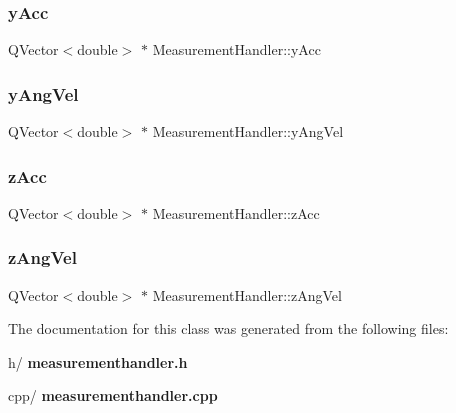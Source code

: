 \subsubsection{y\+Acc}
{\footnotesize\ttfamily Q\+Vector$<$double$>$ $\ast$ Measurement\+Handler\+::y\+Acc\hspace{0.3cm}{\ttfamily [private]}}

\mbox{\label{class_measurement_handler_a070b01770bd61164f1b4672bea4f14dd}} 
\subsubsection{y\+Ang\+Vel}
{\footnotesize\ttfamily Q\+Vector$<$double$>$ $\ast$ Measurement\+Handler\+::y\+Ang\+Vel\hspace{0.3cm}{\ttfamily [private]}}

\mbox{\label{class_measurement_handler_a733eb0086b7fcdb942a770a178fd3862}} 
\subsubsection{z\+Acc}
{\footnotesize\ttfamily Q\+Vector$<$double$>$ $\ast$ Measurement\+Handler\+::z\+Acc\hspace{0.3cm}{\ttfamily [private]}}

\mbox{\label{class_measurement_handler_ac1b7d9eed922dccadd0381ce51b488a5}} 
\subsubsection{z\+Ang\+Vel}
{\footnotesize\ttfamily Q\+Vector$<$double$>$ $\ast$ Measurement\+Handler\+::z\+Ang\+Vel\hspace{0.3cm}{\ttfamily [private]}}



The documentation for this class was generated from the following files\+:\begin{DoxyCompactItemize}
\item 
h/\textbf{ measurementhandler.\+h}\item 
cpp/\textbf{ measurementhandler.\+cpp}\end{DoxyCompactItemize}
